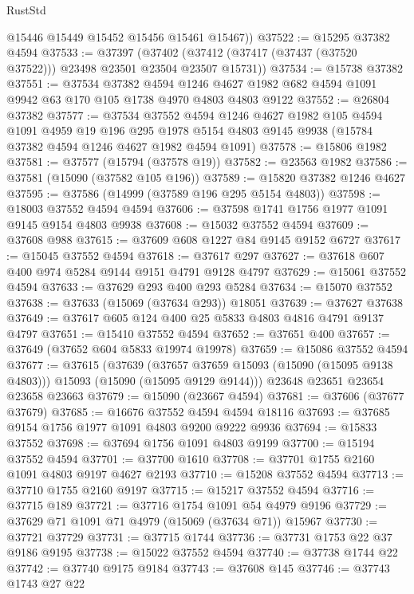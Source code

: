 \begin{lexlean}{RustStd}
\begin{coremodule}
        @15446
        @15449
        @15452
        @15456
        @15461
        @15467))
@37522 := @15295 @37382 @4594
@37533 := @37397
    (@37402 (@37412 (@37417 (@37437 (@37520 @37522))) @23498 @23501 @23504 @23507 @15731))
@37534 := @15738 @37382
@37551 := @37534
    @37382
    @4594
    @1246
    @4627
    @1982
    @682
    @4594
    @1091
    @9942
    @63
    @170
    @105
    @1738
    @4970
    @4803
    @4803
    @9122
@37552 := @26804 @37382
@37577 := @37534
    @37552
    @4594
    @1246
    @4627
    @1982
    @105
    @4594
    @1091
    @4959
    @19
    @196
    @295
    @1978
    @5154
    @4803
    @9145
    @9938
    (@15784 @37382 @4594 @1246 @4627 @1982 @4594 @1091)
@37578 := @15806 @1982
@37581 := @37577 (@15794 (@37578 @19))
@37582 := @23563 @1982
@37586 := @37581 (@15090 (@37582 @105 @196))
@37589 := @15820 @37382 @1246 @4627
@37595 := @37586 (@14999 (@37589 @196 @295 @5154 @4803))
@37598 := @18003 @37552 @4594 @4594
@37606 := @37598 @1741 @1756 @1977 @1091 @9145 @9154 @4803 @9938
@37608 := @15032 @37552 @4594
@37609 := @37608 @988
@37615 := @37609 @608 @1227 @84 @9145 @9152 @6727
@37617 := @15045 @37552 @4594
@37618 := @37617 @297
@37627 := @37618 @607 @400 @974 @5284 @9144 @9151 @4791 @9128 @4797
@37629 := @15061 @37552 @4594
@37633 := @37629 @293 @400 @293 @5284
@37634 := @15070 @37552
@37638 := @37633 (@15069 (@37634 @293)) @18051
@37639 := @37627 @37638
@37649 := @37617 @605 @124 @400 @25 @5833 @4803 @4816 @4791 @9137 @4797
@37651 := @15410 @37552 @4594
@37652 := @37651 @400
@37657 := @37649 (@37652 @604 @5833 @19974 @19978)
@37659 := @15086 @37552 @4594
@37677 := @37615
    (@37639
      (@37657 @37659 @15093 (@15090 (@15095 @9138 @4803)))
      @15093
      (@15090 (@15095 @9129 @9144)))
    @23648
    @23651
    @23654
    @23658
    @23663
@37679 := @15090 (@23667 @4594)
@37681 := @37606 (@37677 @37679)
@37685 := @16676 @37552 @4594 @4594 @18116
@37693 := @37685 @9154 @1756 @1977 @1091 @4803 @9200 @9222 @9936
@37694 := @15833 @37552
@37698 := @37694 @1756 @1091 @4803 @9199
@37700 := @15194 @37552 @4594
@37701 := @37700 @1610
@37708 := @37701 @1755 @2160 @1091 @4803 @9197 @4627 @2193
@37710 := @15208 @37552 @4594
@37713 := @37710 @1755 @2160 @9197
@37715 := @15217 @37552 @4594
@37716 := @37715 @189
@37721 := @37716 @1754 @1091 @54 @4979 @9196
@37729 := @37629 @71 @1091 @71 @4979 (@15069 (@37634 @71)) @15967
@37730 := @37721 @37729
@37731 := @37715 @1744
@37736 := @37731 @1753 @22 @37 @9186 @9195
@37738 := @15022 @37552 @4594
@37740 := @37738 @1744 @22
@37742 := @37740 @9175 @9184
@37743 := @37608 @145
@37746 := @37743 @1743 @27 @22

\end{coremodule}
\end{lexlean}
